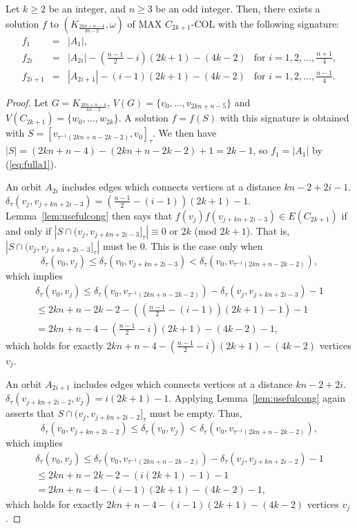 \documentclass[11pt,a4paper]{article}
\begin{document}
\begin{lemma}
\label{lem:splitend}
Let $k \geq 2$ be an integer, and $n \geq 3$ be an odd integer. Then, there exists a solution $f$ to $(K_{\frac{2kn+n-4}{kn-2}},\omega)$ of MAX $C_{2k+1}$-COL with the following signature:
\begin{equation}
\begin{array}{llll}
  f_1 & = & |A_1|,\\
  f_{2i} & = & |A_{2i}|-(\frac{n-1}{2}-i)(2k+1)-(4k-2) & \text{for $i = 1, 2, \ldots, \frac{n+1}{4}$}, \\
  f_{2i+1} & = & |A_{2i+1}|-(i-1)(2k+1)-(4k-2) & \text{for $i = 1,2,\ldots,\frac{n-1}{4}$}.
\end{array}
\end{equation}
\end{lemma}
\begin{proof}
Let  $G = K_{\frac{2kn+n-4}{kn-2}}$, $V(G) =\{ v_0,\ldots,v_{2kn+n-5}\}$ and $V(C_{2k+1}) = \{w_0,\ldots,w_{2k}\}$. A solution $f=f(S)$ with this signature is obtained with
$S = [v_{\tau^{-1}(2kn+n-2k-2)},v_0]_{\tau}.$
We then have $|S| = (2kn+n-4) - (2kn+n-2k-2) + 1 = 2k-1$, so $f_1 = |A_1|$ by (\ref{eq:fulla1}).

An orbit $A_{2i}$ includes edges which connects vertices at a distance $kn-2+2i-1$. $\delta_{\tau}(v_j,v_{j+kn+2i-3}) = (\frac{n-1}{2}-(i-1))(2k+1)-1$. 
Lemma~\ref{lem:usefulcong} then says that $f(v_j) f(v_{j+kn+2i-3}) \in E(C_{2k+1})$
if and only if $|S \cap (v_{j},v_{j+kn+2i-3}]_{\tau}| \equiv 0$ or $2k$ (mod $2k+1$).
That is, $|S \cap (v_{j},v_{j+kn+2i-3}]_{\tau}|$ must be 0.
This is the case only when
\[
\delta_{\tau}(v_0,v_j) \leq \delta_{\tau}(v_0,v_{j+kn+2i-3}) < \delta_{\tau}(v_0,v_{\tau^{-1}(2kn+n-2k-2)}),
\]
which implies
\begin{multline*}
\delta_{\tau}(v_0,v_j) \leq \delta_{\tau}(v_0,v_{\tau^{-1}(2kn+n-2k-2)}) - \delta_{\tau}(v_j,v_{j+kn+2i-3}) - 1 \\
\leq  2kn+n-2k-2-((\frac{n-1}{2}-(i-1))(2k+1)-1)-1 \\
= 2kn+n-4 -(\frac{n-1}{2}-i)(2k+1)-(4k-2)-1,
\end{multline*}
which holds for exactly $2kn+n-4 -(\frac{n-1}{2}-i)(2k+1)-(4k-2)$ vertices $v_j$.

An orbit $A_{2i+1}$ includes edges which connects vertices at a distance $kn-2+2i$. $\delta_{\tau}(v_{j+kn+2i-2},v_j) = i(2k+1)-1$. Applying Lemma~\ref{lem:usefulcong} again asserts that $S \cap (v_{j},v_{j+kn+2i-2}]_{\tau}$ must be empty. Thus,
\[
\delta_{\tau}(v_0,v_{j+kn+2i-2}) \leq \delta_{\tau}(v_0,v_j) < \delta_{\tau}(v_0,v_{\tau^{-1}(2kn+n-2k-2)}),
\]
which implies
\begin{multline*}
\delta_{\tau}(v_0,v_j) \leq \delta_{\tau}(v_0,v_{\tau^{-1}(2kn+n-2k-2)}) - \delta_{\tau}(v_j,v_{j+kn+2i-2}) - 1 \\
\leq 2kn+n-2k-2-(i(2k+1)-1) -1 \\
= 2kn+n-4-(i-1)(2k+1)-(4k-2) - 1,
\end{multline*}
which holds for exactly $2kn+n-4-(i-1)(2k+1)-(4k-2)$ vertices $v_j$.
\end{proof} 
\end{document}
